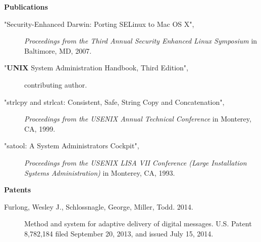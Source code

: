 \documentclass[letterpaper,11pt]{article}
\newcommand{\resheading}[1]{{\large \colorbox{mygrey}{\begin{minipage}{\textwidth}{\textbf{#1 \vphantom{p\^{E}}}}\end{minipage}}}}
\begin{document}
\resheading{Publications}

\begin{description}
\item["Security-Enhanced Darwin: Porting SELinux to Mac OS X",]
\emph{Proceedings from the Third Annual Security Enhanced Linux Symposium} in Baltimore, MD, 2007.
\item["{\sc \bf UNIX} System Administration Handbook, Third Edition",]
contributing author.
\item["strlcpy and strlcat:  Consistent, Safe, String Copy and Concatenation",]
\emph{Proceedings from the USENIX Annual Technical Conference} in Monterey, CA, 1999.
\item["satool:  A System Administrators Cockpit",]
\emph{Proceedings from the USENIX LISA VII Conference (Large Installation Systems Administration)} in Monterey, CA, 1993.
\end{description}

\resheading{Patents}

\begin{description}
\item[Furlong, Wesley J., Schlossnagle, George, Miller, Todd.  2014.]
Method and system for adaptive delivery of digital messages.
U.S. Patent 8,782,184 filed September 20, 2013, and issued July 15, 2014.
\end{description}
\end{document}
